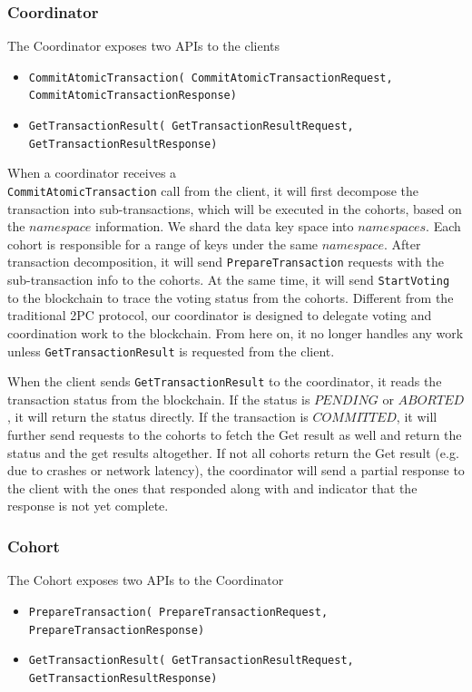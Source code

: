 \documentclass[11pt,conference]{IEEEtran}
\begin{document}
\subsubsection{Coordinator} \label{coordinator}
The Coordinator exposes two APIs to the clients
\begin{itemize}
  \item \texttt{CommitAtomicTransaction(
    CommitAtomicTransactionRequest, CommitAtomicTransactionResponse)}
  \item \texttt{GetTransactionResult(
    GetTransactionResultRequest, GetTransactionResultResponse)}
\end{itemize}   



When a coordinator receives a \texttt{\\CommitAtomicTransaction} call from the client, it will first decompose the transaction into sub-transactions, which will be executed in the cohorts, based on the $namespace$ information. We shard the data key space into $namespaces$. Each cohort is responsible for a range of keys under the same $namespace$. After transaction decomposition, it will send \texttt{PrepareTransaction} requests with the sub-transaction info to the cohorts. At the same time, it will send \texttt{StartVoting} to the blockchain to trace the voting status from the cohorts. Different from the traditional 2PC protocol, our coordinator is designed to delegate voting and coordination work to the blockchain. From here on, it no longer handles any work unless \texttt{GetTransactionResult} is requested from the client.

When the client sends \texttt{GetTransactionResult} to the coordinator, it reads the transaction status from the blockchain. If the status is $PENDING$ or $ABORTED$, it will return the status directly. If the transaction is $COMMITTED$, it will further send requests to the cohorts to fetch the Get result as well and return the status and the get results altogether. If not all cohorts return the Get result (e.g. due to crashes or network latency), the coordinator will send a partial response to the client with the ones that responded along with and indicator that the response is not yet complete.

\subsubsection{Cohort} \label{cohort}

The Cohort exposes two APIs to the Coordinator
\begin{itemize}
  \item \texttt{PrepareTransaction(
    PrepareTransactionRequest, PrepareTransactionResponse)}
  \item \texttt{GetTransactionResult(
    GetTransactionResultRequest, GetTransactionResultResponse)}
\end{itemize} 
\end{document}
